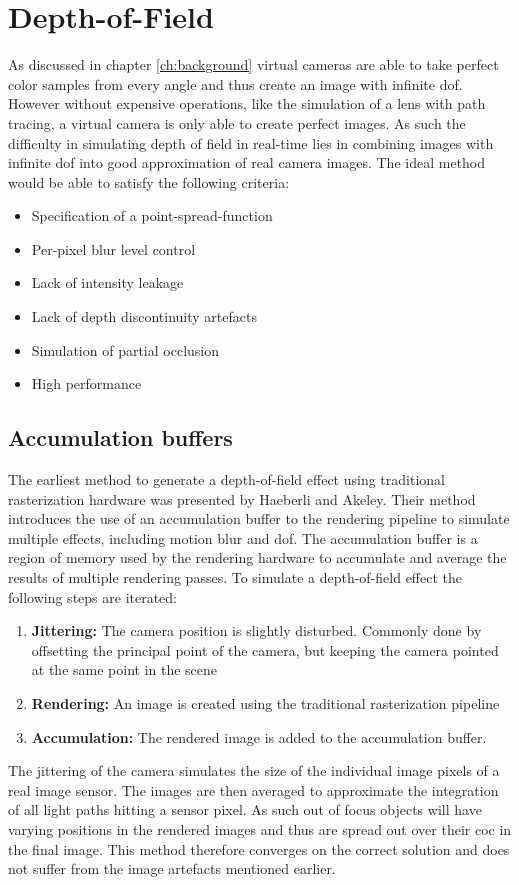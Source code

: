 \chapter{Depth-of-Field}
As discussed in chapter \ref{ch:background} virtual cameras are able to take perfect color samples from every angle and thus create an image with infinite \gls{dof}.
However without expensive operations, like the simulation of a lens with path tracing, a virtual camera is only able to create perfect images.
As such the difficulty in simulating depth of field in real-time lies in combining images with infinite \gls{dof} into good approximation of real camera images.
The ideal method would be able to satisfy the following criteria:
\begin{itemize}
    \item Specification of a point-spread-function
    \item Per-pixel blur level control
    \item Lack of intensity leakage
    \item Lack of depth discontinuity artefacts
    \item Simulation of partial occlusion
    \item High performance
\end{itemize}


\section{Accumulation buffers}
The earliest method to generate a depth-of-field effect using traditional rasterization hardware was presented by Haeberli and Akeley. \cite{Haeberli.1990}
Their method introduces the use of an accumulation buffer to the rendering pipeline to simulate multiple effects, including motion blur and \gls{dof}.
The accumulation buffer is a region of memory used by the rendering hardware to accumulate and average the results of multiple rendering passes.
To simulate a depth-of-field effect the following steps are iterated:
\begin{enumerate}
    \item \textbf{Jittering:} The camera position is slightly disturbed. Commonly done by offsetting the principal point of the camera, but keeping the camera pointed at the same point in the scene
    \item \textbf{Rendering:} An image is created using the traditional rasterization pipeline
    \item \textbf{Accumulation:} The rendered image is added to the accumulation buffer.
\end{enumerate}
The jittering of the camera simulates the size of the individual image pixels of a real image sensor.
The images are then averaged to approximate the integration of all light paths hitting a sensor pixel.
As such out of focus objects will have varying positions in the rendered images and thus are spread out over their \gls{coc} in the final image.
This method therefore converges on the correct solution and does not suffer from the image artefacts mentioned earlier.

